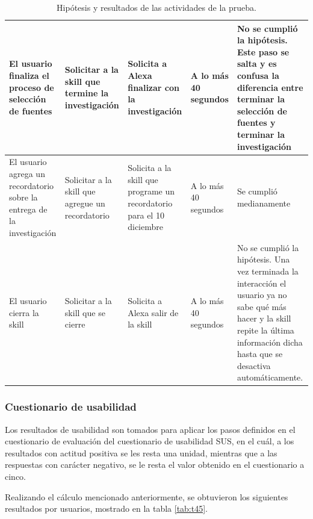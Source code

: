 \begin{table}[t]
  \begin{center}
    \begin{tabular}{ | p{3cm} | p{3cm} | p{3cm} | p{2cm} | p{4cm} | }
      \hline
      El usuario finaliza el proceso de selección de fuentes & Solicitar a la skill que termine la investigación & Solicita a Alexa finalizar con la investigación & A lo más 40 segundos & No se cumplió la hipótesis. Este paso se salta y es confusa la diferencia entre terminar la selección de fuentes y terminar la investigación \\ \hline
      El usuario agrega un recordatorio sobre la entrega de la investigación & Solicitar a la skill que agregue un recordatorio & Solicita a la skill que programe un recordatorio para el 10 diciembre & A lo más 40 segundos & Se cumplió medianamente \\ \hline
      El usuario cierra la skill & Solicitar a la skill que se cierre & Solicita a Alexa salir de la skill & A lo más 40 segundos & No se cumplió la hipótesis. Una vez terminada la interacción el usuario ya no sabe qué más hacer y la skill repite la última información dicha hasta que se desactiva automáticamente. \\ \hline
    \end{tabular}
    \caption{Hipótesis y resultados de las actividades de la prueba.}
    \label{tab:t44}
  \end{center}
\end{table}


\subsubsection{Cuestionario de usabilidad}
\label{CuestionarioUsabilidadcapIV}

Los resultados de usabilidad son tomados para aplicar los pasos definidos en el cuestionario de evaluación del cuestionario de usabilidad SUS, en el cuál, a los resultados con actitud positiva se les resta una unidad, mientras que a las respuestas con carácter negativo, se le resta el valor obtenido en el cuestionario a cinco.

Realizando el cálculo mencionado anteriormente, se obtuvieron los siguientes resultados por usuarios, mostrado en la tabla \ref{tab:t45}.

